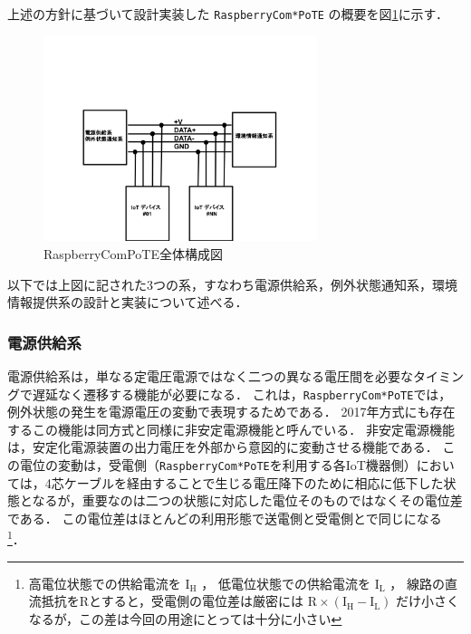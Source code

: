 上述の方針に基づいて設計実装した {\tt Raspberry\-Com*PoTE} の概要を図\ref{RaspberryComPoTE}に示す．

\vspace{-1zh}
\begin{figure}[H]
\centering
\includegraphics[width=8cm]{figspics/RaspberryComPoTE_figx.png}
\caption{{RaspberryComPoTE}全体構成図}
\label{RaspberryComPoTE}
\end{figure}
\vspace{-1zh}

以下では上図に記された3つの系，すなわち電源供給系，例外状態通知系，環境情報提供系の設計と実装について述べる．

\subsubsection{電源供給系}


電源供給系は，単なる定電圧電源ではなく二つの異なる電圧間を必要なタイミングで遅延なく遷移する機能が必要になる．
これは，{\tt Raspberry\-Com*PoTE}では，例外状態の発生を電源電圧の変動で表現するためである．
2017年方式にも存在するこの機能は同方式と同様に非安定電源機能と呼んでいる．
非安定電源機能は，安定化電源装置の出力電圧を外部から意図的に変動させる機能である．
この電位の変動は，受電側（{\tt Raspberry\-Com*PoTE}を利用する各IoT機器側）においては，4芯ケーブルを経由することで生じる電圧降下のために相応に低下した状態となるが，重要なのは二つの状態に対応した電位そのものではなくその電位差である．
この電位差はほとんどの利用形態で送電側と受電側とで同じになる
\footnote{高電位状態での供給電流を $\text{I}_\text{H}$ ，
  低電位状態での供給電流を $\text{I}_\text{L}$ ，
  線路の直流抵抗をRとすると，受電側の電位差は厳密には
  $ \text{R} \times (\text{I}_\text{H} - \text{I}_\text{L}) $
  だけ小さくなるが，この差は今回の用途にとっては十分に小さい}．

